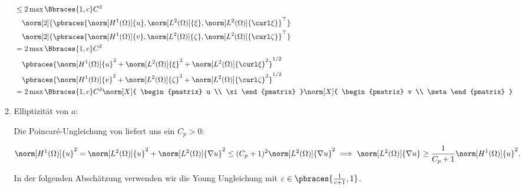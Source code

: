 \begin{solution}
\begin{enumerate}[label = \textbf{\alph*)}]
\begin{enumerate}[label = \arabic*.]
\begin{align*}
{      } \\
      & \leq
      2 \max \Bbraces{1, c} C^2 \\
      & \quad
      \norm[2]
      {
        \pbraces
        {
          \norm[H^1(\Omega)]{u},
          \norm[L^2(\Omega)]{\xi},
          \norm[L^2(\Omega)]{\curl \xi}
        }^\top
      } \\
      & \quad
      \norm[2]
      {
        \pbraces
        {
          \norm[H^1(\Omega)]{v},
          \norm[L^2(\Omega)]{\zeta},
          \norm[L^2(\Omega)]{\curl \zeta}
        }^\top
      } \\
      & =
      2 \max \Bbraces{1, c} C^2 \\
      & \quad
      \pbraces
      {
        \norm[H^1(\Omega)]{u}^2
        +
        \norm[L^2(\Omega)]{\xi}^2
        +
        \norm[L^2(\Omega)]{\curl \xi}^2
      }^{1/2} \\
      & \quad
      \pbraces
      {
        \norm[H^1(\Omega)]{v}^2
        +
        \norm[L^2(\Omega)]{\zeta}^2
        +
        \norm[L^2(\Omega)]{\curl \zeta}^2
      }^{1/2} \\
      & =
      2 \max \Bbraces{1, c} C^2
      \norm[X]
      {
        \begin{pmatrix}
          u \\ \xi
        \end{pmatrix}
      }
      \norm[X]
      {
        \begin{pmatrix}
          v \\ \zeta
        \end{pmatrix}
      }
    \end{align*}

    \item Elliptizität von $a$:
    

    Die Poincaré-Ungleichung von \cite{PDEs} liefert uns ein $C_p > 0:$

    \begin{align*}
      \norm[H^1(\Omega)]{u}^2
      =
      \norm[L^2(\Omega)]{u}^2
      +
      \norm[L^2(\Omega)]{\nabla u}^2
      \leq
      (C_p + 1)^2 \norm[L^2(\Omega)]{\nabla u}^2
      \implies
      \norm[L^2(\Omega)]{\nabla u}
      \geq
      \frac{1}{C_p + 1}
      \norm[H^1(\Omega)]{u}^2.
    \end{align*}

    In der folgenden Abschätzung verwenden wir die Young Ungleichung mit $\varepsilon \in \pbraces{\frac{1}{c + 1}, 1}$.
    

\end{enumerate}
\end{enumerate}
\end{solution}
